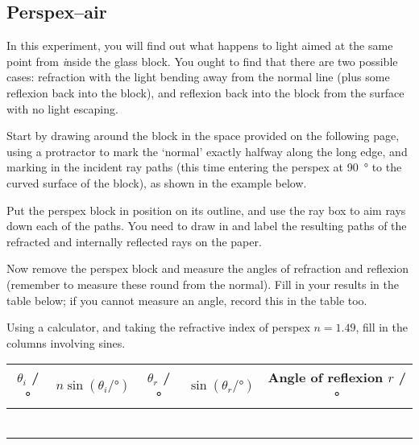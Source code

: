 \newpage

\subsection{Perspex--air}

In this experiment, you will find out what happens to light aimed at the same point from {\emph inside} the glass block.  You ought to find that there are two possible cases: refraction with the light bending away from the normal line (plus some reflexion back into the block), and reflexion back into the block from the surface with no light escaping.

\begin{questions}
\question Start by drawing around the block in the space provided on the following page, using a protractor to mark the `normal' exactly halfway along the long edge, and marking in the incident ray paths (this time entering the perspex at \SI{90}{\degree} to the curved surface of the block), as shown in the example below.

\hfill{}\hfill{}

\question Put the perspex block in position on its outline, and use the ray box to aim rays down each of the paths.  You need to draw in and label the resulting paths of the refracted and internally reflected rays on the paper.  

\question Now remove the perspex block and measure the angles of refraction and reflexion (remember to measure these round from the normal).  Fill in your results in the table below; if you cannot measure an angle, record this in the table too.

\question Using a calculator, and taking the refractive index of perspex $n=1.49$, fill in the columns involving sines.\\

\begin{tabular}{|c|c|c|c|c|}
\hline
 $\theta_{i}$ / \si{\degree} & $n\sin(\theta_{i}/\si{\degree})$ & $\theta_{r}$ / \si{\degree} & $\sin(\theta_{r}/\si{\degree})$ & Angle of reflexion $r$ / \si{\degree}\\
\hline 
&&&& \\
\hline
&&&& \\
\hline
&&&& \\
\hline
&&&& \\
\hline
&&&& \\
\hline
&&&& \\
\hline
\end{tabular}\\


\end{questions}
